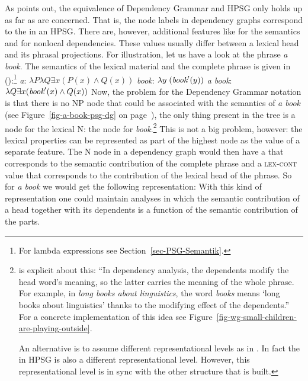 As \citet{Oliva2003a} points out, the equivalence of Dependency Grammar and HPSG only holds up as far
as \headvs are concerned.
That is, the node labels in dependency graphs correspond to the \headvs in
an HPSG. There are, however, additional features like \cont for the semantics and \slasch for
nonlocal dependencies. These values usually differ between a lexical head and its phrasal
projections. For illustration, let us have a look at the phrase \emph{a book}. The semantics of the
lexical material and the complete phrase is given in ():\footnote{%
  For lambda expressions see Section~\ref{sec-PSG-Semantik}.
}
\eal
\ex \emph{a}: $\lambda P \lambda Q \exists x (P(x) \wedge Q(x))$
\ex \emph{book}: $\lambda y\;(\textit{book}'(y))$
\ex \emph{a book}: $\lambda Q \exists x (\textit{book}'(x) \wedge Q(x))$
\zl
Now, the problem for the Dependency Grammar notation is that there is no NP node that could be
associated with the semantics of \emph{a book} (see Figure~\ref{fig-a-book-psg-dg} on page~\pageref{fig-a-book-psg-dg}), the only thing present in the tree is a node for the
lexical N: the node for \emph{book}.\footnote{%
  \citet[--392]{Hudson2003a}\indexwg is explicit about this: ``In dependency analysis, the dependents modify the head
    word's meaning, so the latter carries the meaning of the whole phrase. For example, in
    \emph{long books about linguistics}, the word \emph{books} means `long books about linguistics'
    thanks to the modifying effect of the dependents.'' For a concrete implementation of this idea
    see Figure~\ref{fig-wg-small-children-are-playing-outside}.

   An alternative is to assume different representational levels as in \mtt \citep{Melcuk81a}. In fact the \contv in
   HPSG is also a different representational level. However, this representational level is in sync
   with the other structure that is built.
} This is not a big problem, however: the lexical
properties can be represented as part of the highest node as the value of a separate feature. The N
node in a dependency graph would then have a \contv that corresponds to the semantic contribution of
the complete phrase and a \textsc{lex-cont} value that corresponds to the contribution of the lexical
head of the phrase. So for \emph{a book} we would get the following representation:
\ea
{}
\z
With this kind of representation one could maintain analyses in which the semantic contribution of a
head together with its dependents is a function of the semantic contribution of the parts. 

